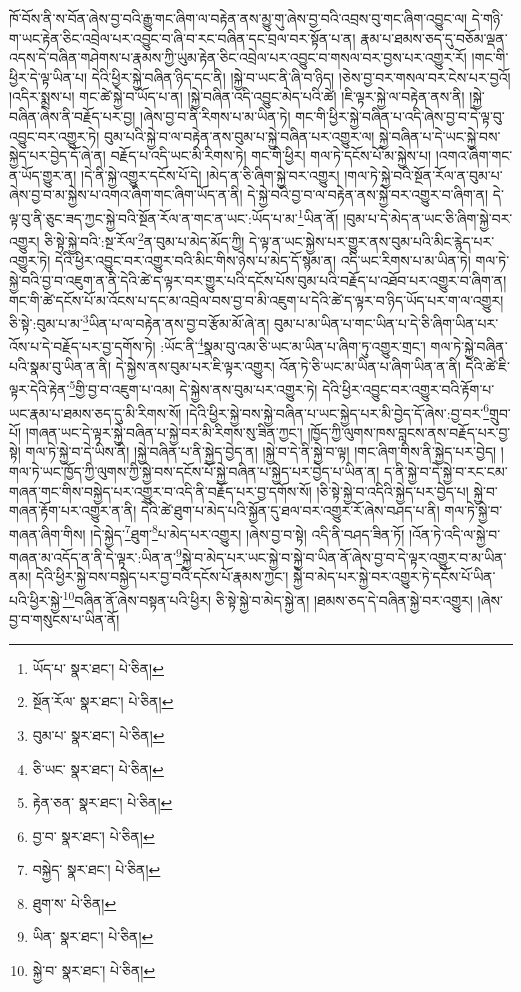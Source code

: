 ཁོ་བོས་ནི་ས་བོན་ཞེས་བྱ་བའི་རྒྱུ་གང་ཞིག་ལ་བརྟེན་ནས་མྱུ་གུ་ཞེས་བྱ་བའི་འབྲས་བུ་གང་ཞིག་འབྱུང་ལ། དེ་གཉི་ག་ཡང་རྟེན་ཅིང་འབྲེལ་པར་འབྱུང་བ་ཞི་བ་རང་བཞིན་དང་བྲལ་བར་སྟོན་པ་ན། རྣམ་པ་ཐམས་ཅད་དུ་བཅོམ་ལྡན་འདས་དེ་བཞིན་གཤེགས་པ་རྣམས་ཀྱི་ཡུམ་རྟེན་ཅིང་འབྲེལ་པར་འབྱུང་བ་གསལ་བར་བྱས་པར་འགྱུར་རོ། །གང་གི་ཕྱིར་དེ་ལྟ་ཡིན་པ། དེའི་ཕྱིར་སྐྱེ་བཞིན་ཉིད་དང་ནི། །སྐྱེ་བ་ཡང་ནི་ཞི་བ་ཉིད། །ཅེས་བྱ་བར་གསལ་བར་ངེས་པར་བྱའོ། །འདིར་སྨྲས་པ། གང་ཚེ་སྐྱེ་བ་ཡོད་པ་ན། །སྐྱེ་བཞིན་འདི་འབྱུང་མེད་པའི་ཚེ། །ཇི་ལྟར་སྐྱེ་ལ་བརྟེན་ནས་ནི། །སྐྱེ་བཞིན་ཞེས་ནི་བརྗོད་པར་བྱ། །ཞེས་བྱ་བ་ནི་རིགས་པ་མ་ཡིན་ཏེ། གང་གི་ཕྱིར་སྐྱེ་བཞིན་པ་འདི་ཞེས་བྱ་བ་དེ་ལྟ་བུ་འབྱུང་བར་འགྱུར་ཏེ། བུམ་པའི་སྐྱེ་བ་ལ་བརྟེན་ནས་བུམ་པ་སྐྱེ་བཞིན་པར་འགྱུར་ལ། སྐྱེ་བཞིན་པ་དེ་ཡང་སྐྱེ་བས་སྐྱེད་པར་བྱེད་དོ་ཞེ་ན། བརྗོད་པ་འདི་ཡང་མི་རིགས་ཏེ། གང་གི་ཕྱིར། གལ་ཏེ་དངོས་པོ་མ་སྐྱེས་པ། །འགའ་ཞིག་གང་ན་ཡོད་གྱུར་ན། །དེ་ནི་སྐྱེ་འགྱུར་དངོས་པོ་དེ། །མེད་ན་ཅི་ཞིག་སྐྱེ་བར་འགྱུར། །གལ་ཏེ་སྐྱེ་བའི་སྔོན་རོལ་ན་བུམ་པ་ཞེས་བྱ་བ་མ་སྐྱེས་པ་འགའ་ཞིག་གང་ཞིག་ཡོད་ན་ནི། དེ་སྐྱེ་བའི་བྱ་བ་ལ་བརྟེན་ནས་སྐྱེ་བར་འགྱུར་བ་ཞིག་ན། དེ་ལྟ་བུ་ནི་ཅུང་ཟད་ཀྱང་སྐྱེ་བའི་སྔོན་རོལ་ན་གང་ན་ཡང་:ཡོད་པ་མ་\footnote{ཡོད་པ་  སྣར་ཐང་།  པེ་ཅིན། }ཡིན་ནོ། །བུམ་པ་དེ་མེད་ན་ཡང་ཅི་ཞིག་སྐྱེ་བར་འགྱུར། ཅི་སྟེ་སྐྱེ་བའི་:སྔ་རོལ་\footnote{སྔོན་རོལ་  སྣར་ཐང་།  པེ་ཅིན། }ན་བུམ་པ་མེད་མོད་ཀྱི། དེ་ལྟ་ན་ཡང་སྐྱེས་པར་གྱུར་ནས་བུམ་པའི་མིང་རྙེད་པར་འགྱུར་ཏེ། དེའི་ཕྱིར་འབྱུང་བར་འགྱུར་བའི་མིང་གིས་ཉེས་པ་མེད་དོ་སྙམ་ན། འདི་ཡང་རིགས་པ་མ་ཡིན་ཏེ། གལ་ཏེ་སྐྱེ་བའི་བྱ་བ་འཇུག་ན་ནི་དེའི་ཚེ་ད་ལྟར་བར་གྱུར་པའི་དངོས་པོས་བུམ་པའི་བརྗོད་པ་འཐོབ་པར་འགྱུར་བ་ཞིག་ན། གང་གི་ཚེ་དངོས་པོ་མ་འོངས་པ་དང་མ་འབྲེལ་བས་བྱ་བ་མི་འཇུག་པ་དེའི་ཚེ་ད་ལྟར་བ་ཉིད་ཡོད་པར་ག་ལ་འགྱུར། ཅི་སྟེ་:བུམ་པ་མ་\footnote{བུམ་པ་  སྣར་ཐང་།  པེ་ཅིན། }ཡིན་པ་ལ་བརྟེན་ནས་བྱ་བ་རྩོམ་མོ་ཞེ་ན། བུམ་པ་མ་ཡིན་པ་གང་ཡིན་པ་དེ་ཅི་ཞིག་ཡིན་པར་འོས་པ་དེ་བརྗོད་པར་བྱ་དགོས་ཏེ། :ཡོང་ནི་\footnote{ཅི་ཡང་  སྣར་ཐང་།  པེ་ཅིན། }སྣམ་བུ་འམ་ཅི་ཡང་མ་ཡིན་པ་ཞིག་ཏུ་འགྱུར་གྲང་། གལ་ཏེ་སྐྱེ་བཞིན་པའི་སྣམ་བུ་ཡིན་ན་ནི། དེ་སྐྱེས་ནས་བུམ་པར་ཇི་ལྟར་འགྱུར། འོན་ཏེ་ཅི་ཡང་མ་ཡིན་པ་ཞིག་ཡིན་ན་ནི། དེའི་ཚེ་ཇི་ལྟར་དེའི་རྟེན་\footnote{རྟེན་ཅན་  སྣར་ཐང་།  པེ་ཅིན། }གྱི་བྱ་བ་འཇུག་པ་འམ། དེ་སྐྱེས་ནས་བུམ་པར་འགྱུར་ཏེ། དེའི་ཕྱིར་འབྱུང་བར་འགྱུར་བའི་རྟོག་པ་ཡང་རྣམ་པ་ཐམས་ཅད་དུ་མི་རིགས་སོ། །དེའི་ཕྱིར་སྐྱེ་བས་སྐྱེ་བཞིན་པ་ཡང་སྐྱེད་པར་མི་བྱེད་དོ་ཞེས་:བྱ་བར་\footnote{བྱ་བ་  སྣར་ཐང་།  པེ་ཅིན། }གྲུབ་པོ། །གཞན་ཡང་དེ་ལྟར་སྐྱེ་བཞིན་པ་སྐྱེ་བར་མི་རིགས་སུ་ཟིན་ཀྱང་། །ཁྱོད་ཀྱི་ལུགས་ཁས་བླངས་ནས་བརྗོད་པར་བྱ་སྟེ། གལ་ཏེ་སྐྱེ་བ་དེ་ཡིས་ནི། །སྐྱེ་བཞིན་པ་ནི་སྐྱེད་བྱེད་ན། །སྐྱེ་བ་དེ་ནི་སྐྱེ་བ་ལྟ། །གང་ཞིག་གིས་ནི་སྐྱེད་པར་བྱེད། །གལ་ཏེ་ཡང་ཁྱོད་ཀྱི་ལུགས་ཀྱི་སྐྱེ་བས་དངོས་པོ་སྐྱེ་བཞིན་པ་སྐྱེད་པར་བྱེད་པ་ཡིན་ན། ད་ནི་སྐྱེ་བ་དེ་སྐྱེ་བ་རང་ངམ་གཞན་གང་གིས་བསྐྱེད་པར་འགྱུར་བ་འདི་ནི་བརྗོད་པར་བྱ་དགོས་སོ། །ཅི་སྟེ་སྐྱེ་བ་འདིའི་སྐྱེད་པར་བྱེད་པ། སྐྱེ་བ་གཞན་རྟོག་པར་འགྱུར་ན་ནི། དེའི་ཚེ་ཐུག་པ་མེད་པའི་སྐྱོན་དུ་ཐལ་བར་འགྱུར་རོ་ཞེས་བཤད་པ་ནི། གལ་ཏེ་སྐྱེ་བ་གཞན་ཞིག་གིས། །དེ་སྐྱེད་\footnote{བསྐྱེད་  སྣར་ཐང་།  པེ་ཅིན། }ཐུག་\footnote{ཐུག་ས་  པེ་ཅིན། }པ་མེད་པར་འགྱུར། །ཞེས་བྱ་བ་སྟེ། འདི་ནི་བཤད་ཟིན་ཏོ། །འོན་ཏེ་འདི་ལ་སྐྱེ་བ་གཞན་མ་འདོད་ན་ནི་དེ་ལྟར་:ཡིན་ན་\footnote{ཡིན་  སྣར་ཐང་།  པེ་ཅིན། }སྐྱེ་བ་མེད་པར་ཡང་སྐྱེ་བ་སྐྱེ་བ་ཡིན་ནོ་ཞེས་བྱ་བ་དེ་ལྟར་འགྱུར་བ་མ་ཡིན་ནམ། དེའི་ཕྱིར་སྐྱེ་བས་བསྐྱེད་པར་བྱ་བའི་དངོས་པོ་རྣམས་ཀྱང་། སྐྱེ་བ་མེད་པར་སྐྱེ་བར་འགྱུར་ཏེ་དངོས་པོ་ཡིན་པའི་ཕྱིར་སྐྱེ་\footnote{སྐྱེ་བ་  སྣར་ཐང་།  པེ་ཅིན། }བཞིན་ནོ་ཞེས་བསྟན་པའི་ཕྱིར། ཅི་སྟེ་སྐྱེ་བ་མེད་སྐྱེ་ན། །ཐམས་ཅད་དེ་བཞིན་སྐྱེ་བར་འགྱུར། །ཞེས་བྱ་བ་གསུངས་པ་ཡིན་ནོ། 
